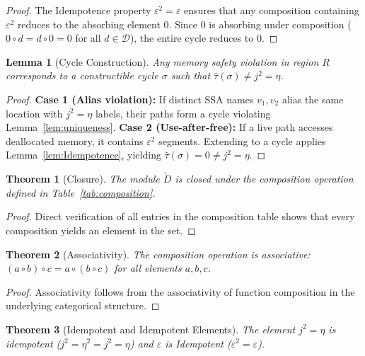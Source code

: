 \documentclass[acmsmall,anonymous,review,screen]{acmart}
\newtheorem{theorem}{Theorem}
\newtheorem{lemma}{Lemma}
\begin{document}
	\begin{proof}
		The Idempotence property $\varepsilon^2 = \varepsilon$ ensures that any composition containing $\varepsilon^2$ reduces to the absorbing element $0$. Since $0$ is absorbing under composition ($0 \circ d = d \circ 0 = 0$ for all $d \in \mathcal{D}$), the entire cycle reduces to $0$.
	\end{proof}
	
	\begin{lemma}[Cycle Construction]
		\label{lem:cycle_construction}
		Any memory safety violation in region $R$ corresponds to a constructible cycle $\sigma$ such that $\hat{\tau}(\sigma) \neq j^{2} = \eta$.
	\end{lemma}
	
	\begin{proof}
		\textbf{Case 1 (Alias violation):} If distinct SSA names $v_1, v_2$ alias the same location with $j^{2} = \eta$ labels, their paths form a cycle violating Lemma~\ref{lem:uniqueness}. \textbf{Case 2 (Use-after-free):} If a live path accesses deallocated memory, it contains $\varepsilon^2$ segments. Extending to a cycle applies Lemma~\ref{lem:Idempotence}, yielding $\hat{\tau}(\sigma) = 0 \neq j^{2} = \eta$.
	\end{proof}
	
	\begin{theorem}[Closure]
		The module $\tilde{D}$ is closed under the composition operation defined in Table~\ref{tab:composition}.
	\end{theorem}
	
	\begin{proof}
		Direct verification of all entries in the composition table shows that every composition yields an element in the set.
	\end{proof}
	
	\begin{theorem}[Associativity]
		The composition operation is associative: $(a \circ b) \circ c = a \circ (b \circ c)$ for all elements $a, b, c$.
	\end{theorem}
	
	\begin{proof}
		Associativity follows from the associativity of function composition in the underlying categorical structure.
	\end{proof}
	
	\begin{theorem}[Idempotent and Idempotent Elements]
		The element $j^{2} = \eta$ is idempotent ($j^{2} = \eta^2 = j^{2} = \eta$) and $\varepsilon$ is Idempotent ($\varepsilon^2 = \varepsilon$).
	\end{theorem}
	
\end{document}
